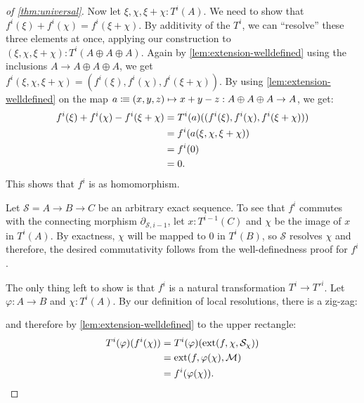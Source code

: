 \begin{proof}[of \cref{thm:universal}]
  Now let $\xi,\chi,\xi+\chi:T^i(A)$.
  We need to show that $f^i(\xi)+f^i(\chi)=f^i(\xi+\chi)$.
  By additivity of the $T^i$,
  we can ``resolve'' these three elements at once, applying our construction to $(\xi,\chi,\xi+\chi):T^i(A\oplus A\oplus A)$.
  Again by \cref{lem:extension-welldefined} using the inclusions $A\to A\oplus A\oplus A$,
  we get $f^i(\xi,\chi,\xi+\chi)=(f^i(\xi),f^i(\chi),f^i(\xi+\chi))$.
  By using \cref{lem:extension-welldefined} on the map $a\vcentcolon\mspace{-1.2mu}\equiv (x,y,z)\mapsto x+y-z:A\oplus A\oplus A\to A$, we get:
  \begin{align*}
    f^i(\xi)+f^i(\chi)-f^i(\xi+\chi) &=T^i(a)((f^i(\xi),f^i(\chi),f^i(\xi+\chi))) \\
                                     &=f^i(a(\xi,\chi,\xi+\chi)) \\
                                     &=f^i(0) \\
                                     &=0
                                       \rlap{.}
  \end{align*}
  This shows that $f^i$ is as homomorphism.
  
  Let $\mathcal{S}=A\to B\to C$ be an arbitrary exact sequence.
  To see that $f^i$ commutes with the connecting morphism $\partial_{\mathcal{S},i-1}$,
  let $x:T^{i-1}(C)$ and $\chi$ be the image of $x$ in $T^i(A)$.
  By exactness, $\chi$ will be mapped to 0 in $T^i(B)$, so $\mathcal{S}$
  resolves $\chi$ and therefore, the desired commutativity follows from the well-definedness proof for $f^i$.
  
  The only thing left to show
  is that $f^i$ is a natural transformation $T^i\to T'^i$.
  Let $\varphi:A\to B$ and $\chi:T^i(A)$.
  By our definition of local resolutions,
  there is a zig-zag:
  \begin{center}
  \end{center}
  and therefore by \cref{lem:extension-welldefined} to the upper rectangle:
  \begin{align*}
    T^i(\varphi)(f^i(\chi)) &= T^i(\varphi)(\mathrm{ext}(f,\chi,\mathcal{S}_\chi)) \\
                            &=\mathrm{ext}(f,\varphi(\chi),\mathcal{M}) \\
                            &=f^i(\varphi(\chi))
                              \rlap{.}
  \end{align*}
\end{proof}
